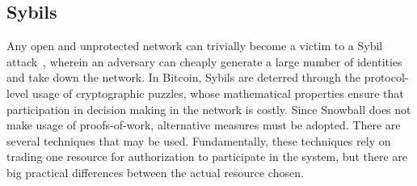 \subsection{Sybils}
\label{subsection:sybil}
Any open and unprotected network can trivially become a victim to a Sybil attack~\cite{douceur2002sybil}, wherein an adversary can cheaply generate a large number of identities and take down the network. 
In Bitcoin, Sybils are deterred through the protocol-level usage of cryptographic puzzles, whose mathematical properties ensure that participation in decision making in the network is costly. 
Since Snowball does not make usage of proofs-of-work, alternative measures must be adopted. 
There are several techniques that may be used. 
Fundamentally, these techniques rely on trading one resource for authorization to participate in the system, but there are big practical differences between the actual resource chosen.
